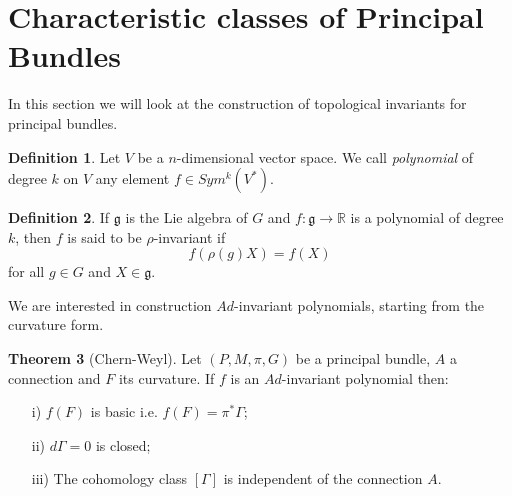 \documentclass[12pt,a4paper]{report}
\theoremstyle{definition}
\newtheorem{Def}{Definition}[chapter]
\theoremstyle{Theorem}
\newtheorem{Theo}[Def]{Theorem}
\theoremstyle{break}
\theoremstyle{definition}
\begin{document}
		\section{Characteristic classes of Principal Bundles}
		In this section we will look at the construction of topological invariants for principal bundles.
		\begin{Def}
			Let $V$ be a $n$-dimensional vector space. We call \textit{polynomial} of degree $k$ on $V$ any element $f\in Sym^k(V^*)$.
		\end{Def}
		\begin{Def}
			If $\mathfrak{g}$ is the Lie algebra of $G$ and $f:\mathfrak{g}\rightarrow \mathbb{R}$ is a polynomial of degree $k$, then $f$ is said to be $\rho$-invariant if
			$$f(\rho(g)X)=f(X)$$
			for all $g\in G$ and $X\in \mathfrak{g}$.
		\end{Def}
		We are interested in construction $Ad$-invariant polynomials, starting from the curvature form.
		\begin{Theo}[Chern-Weyl]
			Let $(P,M,\pi,G)$ be a principal bundle, $A$ a connection and $F$ its curvature. If $f$ is an $Ad$-invariant polynomial then:
			\begin{itemize}
				\item[i)] $f(F)$ is basic i.e. $f(F)=\pi^*\Gamma$;
				\item[ii)] $d\Gamma=0$ is closed;
				\item[iii)] The cohomology class $[\Gamma]$ is independent of the connection $A$.
			\end{itemize}
		\end{Theo}
\end{document}
